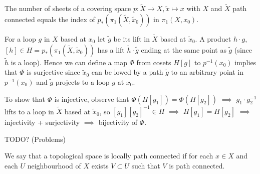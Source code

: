 \documentclass[12pt]{article}					%
\begin{document}
\begin{tvrzeni}
	The number of sheets of a covering space $p: \tilde X \rightarrow X, \tilde x \mapsto x$ with $X$ and $\tilde X$ path connected equals the index of $p_*(π_1(\tilde X, \tilde x_0))$ in $π_1(X, x_0)$.

	\begin{dukazin}
		For a loop $g$ in $X$ based at $x_0$ let $\tilde g$ be its lift in $\tilde X$ based at $\tilde x_0$. A product $h·g$, $[h] \in H = p_*(π_1(\tilde X, \tilde x_0))$ has a lift $\tilde h·\tilde g$ ending at the same point as $\tilde g$ (since $\tilde h$ is a loop). Hence we can define a map $Φ$ from cosets $H[g]$ to $p^{-1}(x_0)$ implies that $Φ$ is surjective since $\tilde x_0$ can be lowed by a path $\tilde g$ to an arbitrary point in $p^{-1}(x_0)$ and $\tilde g$ projects to a loop $g$ at $x_0$.

		To show that $Φ$ is injective, observe that $Φ(H[g_1]) = Φ(H[g_2])$ $\implies$ $g_1·g_2^{-1}$ lifts to a loop in $\tilde X$ based at $\tilde x_0$, so $[g_1][g_2]^{-1} \in H$ $\implies$ $H[g_1] = H[g_2]$ $\implies$ injectivity + surjectivity $\implies$ bijectivity of $Φ$.
	\end{dukazin}
\end{tvrzeni}


TODO? (Problems)


\begin{definice}
	We say that a topological space is locally path connected if for each $x \in X$ and each $U$ neighbourhood of $X$ exists $V \subset U$ such that $V$ is path connected.
\end{definice}
\end{document}
